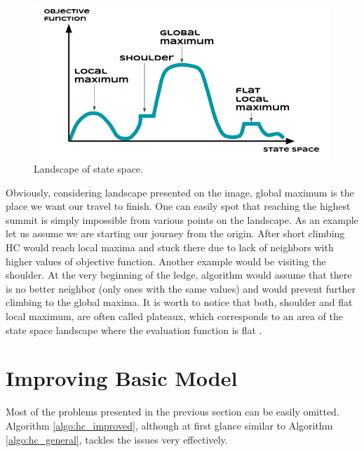\documentclass{mini}
\begin{document}
\begin{figure}
  \begin{flushleft}
     \includegraphics[width=1\textwidth]{./images/hp_landscape.png} 
  \end{flushleft}
  \label{fig:state_space}
  \caption{Landscape of state space.}
\end{figure}

Obviously, considering landscape presented on the image, global maximum is the place we want our travel to finish. One can easily spot that reaching the highest summit is simply impossible from various points on the landscape. As an example let us assume we are starting our journey from the origin. After short climbing HC would reach local maxima and stuck there due to lack of neighbors with higher values of objective function. Another example would be visiting the shoulder. At the very beginning of the ledge, algorithm would assume that there is no better neighbor (only ones with the same values) and would prevent further climbing to the global maxima. It is worth to notice that both, shoulder and flat local maximum, are often called plateaux, which corresponds to an area of the state space landscape where the evaluation function is flat \cite{hc_3}.

\section{Improving Basic Model} \label{sec:improving basic model}
Most of the problems presented in the previous section can be easily omitted. Algorithm \ref{algo:hc_improved}, although at first glance similar to Algorithm \ref{algo:hc_general}, tackles the issues very effectively. 
\end{document}
